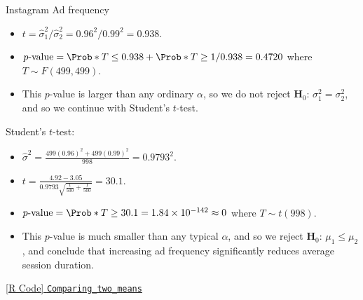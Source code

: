 \begin{Example}{Instagram Ad frequency}{}
\begin{framed}
\begin{itemize}
            \item $ t=\hat{\sigma}_1^2/\hat{\sigma}_2^2=0.96^2/0.99^2=0.938 $.
            \item $ p\text{-value}=\Prob*{T\le 0.938}+\Prob*{T\ge 1/0.938}=0.4720 $
                  where $ T \sim F(499,499) $.
            \item This $ p $-value is larger than any ordinary $ \alpha $, so
                  we do not reject $ \mathbf{H}_0 $: $ \sigma_1^2=\sigma_2^2 $, and so we continue
                  with Student's $ t $-test.
        \end{itemize}
    \end{framed}
    \begin{framed}
        Student's $ t $-test:
        \begin{itemize}
            \item $ \displaystyle \hat{\sigma}^2=\frac{499(0.96)^2+499(0.99)^2}{998}=0.9793^2 $.
            \item $ \displaystyle t=\frac{4.92-3.05}{0.9793\sqrt{\frac{1}{500} +\frac{1}{500} }}=30.1  $.
            \item $ p\text{-value}=\Prob*{T\ge 30.1}=1.84\times 10^{-142}\approx 0 $ where $ T \sim t(998) $.
            \item This $ p $-value is much smaller than any typical $ \alpha $, and so we reject
                  $ \mathbf{H}_0 $: $ \mu_1\le \mu_2 $, and conclude that increasing ad frequency significantly
                  reduces average session duration.
        \end{itemize}
    \end{framed}
    \href{https://github.com/Hextical/university-notes/blob/master/year-3/semester-3/STAT 430/code/Comparing_two_means.R}{[R Code] \texttt{Comparing\_two\_means}}
\end{Example}
